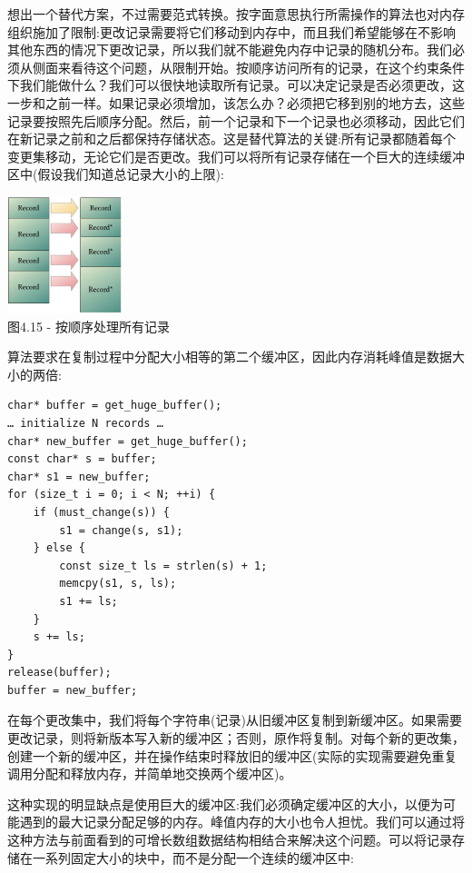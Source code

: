 想出一个替代方案，不过需要范式转换。按字面意思执行所需操作的算法也对内存组织施加了限制:更改记录需要将它们移动到内存中，而且我们希望能够在不影响其他东西的情况下更改记录，所以我们就不能避免内存中记录的随机分布。我们必须从侧面来看待这个问题，从限制开始。按顺序访问所有的记录，在这个约束条件下我们能做什么？我们可以很快地读取所有记录。可以决定记录是否必须更改，这一步和之前一样。如果记录必须增加，该怎么办？必须把它移到别的地方去，这些记录要按照先后顺序分配。然后，前一个记录和下一个记录也必须移动，因此它们在新记录之前和之后都保持存储状态。这是替代算法的关键:所有记录都随着每个变更集移动，无论它们是否更改。我们可以将所有记录存储在一个巨大的连续缓冲区中(假设我们知道总记录大小的上限):

\begin{center}
\includegraphics[width=0.25\textwidth]{content/1/chapter4/images/15.jpg}\\
图4.15 - 按顺序处理所有记录
\end{center}

算法要求在复制过程中分配大小相等的第二个缓冲区，因此内存消耗峰值是数据大小的两倍:

\begin{lstlisting}[style=styleCXX]
char* buffer = get_huge_buffer();
… initialize N records …
char* new_buffer = get_huge_buffer();
const char* s = buffer;
char* s1 = new_buffer;
for (size_t i = 0; i < N; ++i) {
	if (must_change(s)) {
		s1 = change(s, s1);
	} else {
		const size_t ls = strlen(s) + 1;
		memcpy(s1, s, ls);
		s1 += ls;
	}
	s += ls;
}
release(buffer);
buffer = new_buffer;
\end{lstlisting}

在每个更改集中，我们将每个字符串(记录)从旧缓冲区复制到新缓冲区。如果需要更改记录，则将新版本写入新的缓冲区；否则，原作将复制。对每个新的更改集，创建一个新的缓冲区，并在操作结束时释放旧的缓冲区(实际的实现需要避免重复调用分配和释放内存，并简单地交换两个缓冲区)。

这种实现的明显缺点是使用巨大的缓冲区:我们必须确定缓冲区的大小，以便为可能遇到的最大记录分配足够的内存。峰值内存的大小也令人担忧。我们可以通过将这种方法与前面看到的可增长数组数据结构相结合来解决这个问题。可以将记录存储在一系列固定大小的块中，而不是分配一个连续的缓冲区中:

